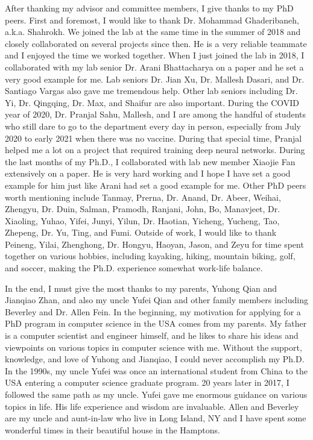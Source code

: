 After thanking my advisor and committee members, I give thanks to my PhD peers. First and foremost, I would like to thank Dr. Mohammad Ghaderibaneh, a.k.a. Shahrokh.
We joined the lab at the same time in the summer of 2018 and closely collaborated on several projects since then. 
He is a very reliable teammate and I enjoyed the time we worked together.
When I just joined the lab in 2018, I collaborated with my lab senior Dr. Arani Bhattacharya on a paper and he set a very good example for me. 
Lab seniors Dr. Jian Xu, Dr. Mallesh Dasari, and Dr. Santiago Vargas also gave me tremendous help. Other lab seniors including Dr. Yi, Dr. Qingqing, Dr. Max, and Shaifur are also important.
During the COVID year of 2020, Dr. Pranjal Sahu, Mallesh, and I are among the handful of students who still dare to go to the department every day in person, 
especially from July 2020 to early 2021 when there was no vaccine.
During that special time, Pranjal helped me a lot on a project that required training deep neural networks.
During the last months of my Ph.D., I collaborated with lab new member Xiaojie Fan extensively on a paper.
He is very hard working and I hope I have set a good example for him just like Arani had set a good example for me.
Other PhD peers worth mentioning include Tanmay, Prerna, Dr. Anand, Dr. Abeer, Weihai, Zhengyu, Dr. Duin, Salman, Pramodh, Ranjani, John, Bo, Manavjeet, Dr. Xiaoling, Yuhao, Yifei, Junyi, Yilun, Dr. Haotian, Yicheng, Yucheng, Tao, Zhepeng, Dr. Yu, Ting, and Fumi.
Outside of work, I would like to thank Peineng, Yilai, Zhenghong, Dr. Hongyu, Haoyan, Jason, and Zeyu for time spent together on various hobbies, including kayaking, hiking, mountain biking, golf, and soccer, making the Ph.D. experience somewhat work-life balance.

In the end, I must give the most thanks to my parents, Yuhong Qian and Jianqiao Zhan, and also my uncle Yufei Qian 
and other family members including Beverley and Dr. Allen Fein.
In the beginning, my motivation for applying for a PhD program in computer science in the USA comes from my parents.
My father is a computer scientist and engineer himself, and he likes to share his ideas and viewpoints on various topics in computer science with me.
Without the support, knowledge, and love of Yuhong and Jianqiao, I could never accomplish my Ph.D.
In the 1990s, my uncle Yufei was once an international student from China to the USA entering a computer science graduate program.
20 years later in 2017, I followed the same path as my uncle. 
Yufei gave me enormous guidance on various topics in life. His life experience and wisdom are invaluable.
Allen and Beverley are my uncle and aunt-in-law who live in Long Island, NY and I have spent some wonderful times in their beautiful house in the Hamptons.

